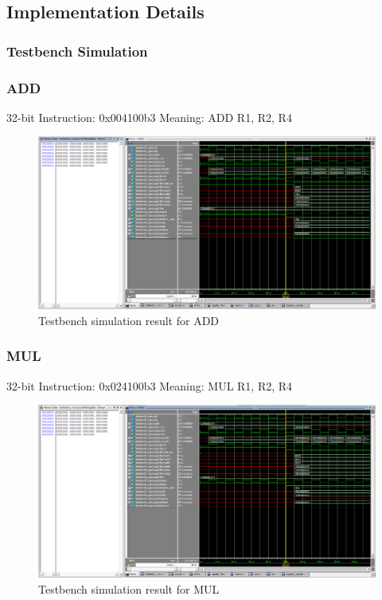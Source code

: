 \subsection{Implementation Details}
\label{sect6_4_3}

\subsubsection{Testbench Simulation}
\label{sect6_4_3_2}

\subsubsection*{ADD}
\label{sect6_4_3_2a}

32-bit Instruction: 0x004100b3 \newline
Meaning: ADD R1, R2, R4 \newline

\begin{figure}[h!]
\centering
\includegraphics[width=\linewidth]{figures/RISCV_Implementation_ADD.PNG}
\caption{Testbench simulation result for ADD}
\label{fig:riscv9}
\end{figure}

\subsubsection*{MUL}
\label{sect6_4_3_2b}

32-bit Instruction: 0x024100b3 \newline
Meaning: MUL R1, R2, R4

\begin{figure}[h!]
\centering
\includegraphics[width=\linewidth]{figures/RISCV_Implementation_MUL.PNG}
\caption{Testbench simulation result for MUL}
\label{fig:riscv10}
\end{figure}

